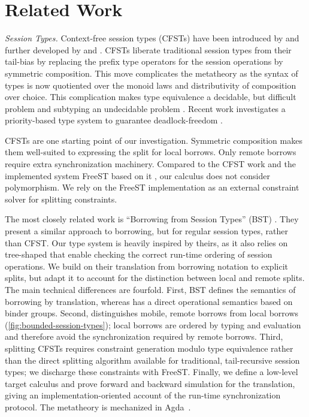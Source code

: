 
\section{Related Work}
\label{sec:related-work}

\emph{Session Types.}
%
Context-free session types (CFSTs) have been introduced by
\citet{DBLP:conf/icfp/ThiemannV16} and further developed by
\citet{DBLP:journals/toplas/Padovani19} and
\citet{DBLP:journals/iandc/AlmeidaMTV22}. CFSTs liberate traditional 
session types from their tail-bias by replacing the prefix type
operators for the session operations by symmetric composition. This
move complicates the metatheory as the syntax of types is now
quotiented over the monoid laws and distributivity of composition over
choice. This complication makes type equivalence a decidable, but
difficult problem \cite{DBLP:conf/tacas/AlmeidaMV20} and subtyping an
undecidable problem
\cite{DBLP:journals/toplas/Padovani19,DBLP:journals/tcs/SilvaMV26}. Recent work
investigates a priority-based type system to guarantee deadlock-freedom
\cite{DBLP:conf/forte/MordidoP26}. 

CFSTs are one starting point of our investigation. Symmetric
composition makes them well-suited to expressing the split for local
borrows. Only remote borrows require extra synchronization
machinery. Compared to the CFST work and the implemented system FreeST
based on it \cite{almeida26:_frees_concur_progr_languag_with}, our
calculus does not consider polymorphism. We rely on the FreeST
implementation as an external constraint solver for splitting
constraints.


The most closely related work is ``Borrowing from Session Types'' (BST) \cite{DBLP:journals/pacmpl/SaffrichS0V25}.
They present a similar approach to borrowing, but for regular session types, rather than CFST.
Our type system is heavily inspired by theirs, as it also relies on
tree-shaped that enable checking the correct run-time ordering of session operations.
We build on their translation from borrowing notation to explicit
splits, but adapt it to account for the distinction between local and
remote splits. The main technical differences are fourfold. First, BST
defines the semantics of borrowing by translation, whereas
\thecalculus has a direct operational semantics based on binder
groups. Second, \thecalculus distinguishes mobile, remote borrows from
local borrows (\cref{fig:bounded-session-types}); local
borrows are ordered by typing and evaluation and therefore avoid the
synchronization required by remote borrows. Third, splitting CFSTs
requires constraint generation modulo type equivalence rather than the
direct splitting algorithm available for traditional, tail-recursive
session types; we discharge these constraints with FreeST. Finally, we
define a low-level target calculus and prove forward and backward
simulation for the translation, giving an implementation-oriented account of the
run-time synchronization protocol. The metatheory is mechanized in
Agda~\cite{Agda}.

